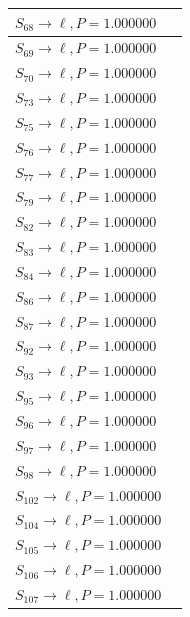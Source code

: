 \begin{tabular}{|l|c|}
\hline
$S_{68} \to \ell, P=1.000000$ & \\
\hline
$S_{69} \to \ell, P=1.000000$ & \\
\hline
$S_{70} \to \ell, P=1.000000$ & \\
\hline
$S_{73} \to \ell, P=1.000000$ & \\
\hline
$S_{75} \to \ell, P=1.000000$ & \\
\hline
$S_{76} \to \ell, P=1.000000$ & \\
\hline
$S_{77} \to \ell, P=1.000000$ & \\
\hline
$S_{79} \to \ell, P=1.000000$ & \\
\hline
$S_{82} \to \ell, P=1.000000$ & \\
\hline
$S_{83} \to \ell, P=1.000000$ & \\
\hline
$S_{84} \to \ell, P=1.000000$ & \\
\hline
$S_{86} \to \ell, P=1.000000$ & \\
\hline
$S_{87} \to \ell, P=1.000000$ & \\
\hline
$S_{92} \to \ell, P=1.000000$ & \\
\hline
$S_{93} \to \ell, P=1.000000$ & \\
\hline
$S_{95} \to \ell, P=1.000000$ & \\
\hline
$S_{96} \to \ell, P=1.000000$ & \\
\hline
$S_{97} \to \ell, P=1.000000$ & \\
\hline
$S_{98} \to \ell, P=1.000000$ & \\
\hline
$S_{102} \to \ell, P=1.000000$ & \\
\hline
$S_{104} \to \ell, P=1.000000$ & \\
\hline
$S_{105} \to \ell, P=1.000000$ & \\
\hline
$S_{106} \to \ell, P=1.000000$ & \\
\hline
$S_{107} \to \ell, P=1.000000$ & \\
\hline
\end{tabular}

